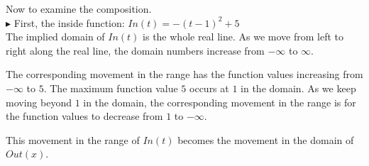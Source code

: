 \documentclass{ximera}
\begin{document}
\begin{image}
\end{image}





Now to examine the composition. \\



$\blacktriangleright$  First, the inside function: $In(t) = -(t-1)^2 + 5$ \\

The implied domain of $In(t)$ is the whole real line. As we move from left to right along the real line, the domain numbers increase from $-\infty$ to $\infty$.

The corresponding movement in the range has the function values increasing from $-\infty$ to $5$.  The maximum function value $5$ occurs at $1$ in the domain.  As we keep moving beyond $1$ in the domain, the corresponding movement in the range is for the function values to decrease from $1$ to $-\infty$.


This movement in the range of $In(t)$ becomes the movement in the domain of $Out(x)$. \\
\end{document}
